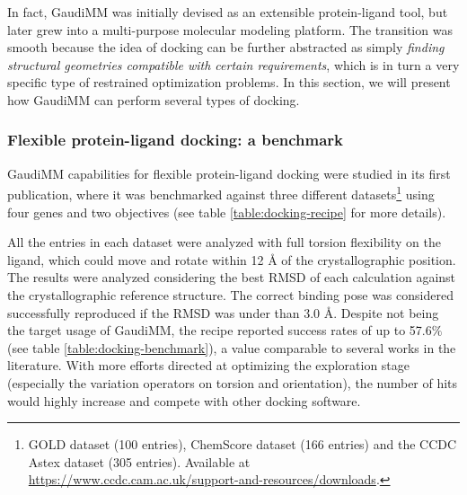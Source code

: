 In fact, GaudiMM was initially devised as an extensible protein-ligand tool, but later grew into a multi-purpose molecular modeling platform. The transition was smooth because the idea of docking can be further abstracted as simply \textit{finding structural geometries compatible with certain requirements}, which is in turn a very specific type of restrained optimization problems. In this section, we will present how GaudiMM can perform several types of docking.


\subsubsection{Flexible protein-ligand docking: a benchmark}


GaudiMM capabilities for flexible protein-ligand docking were studied in its first publication,\cite{gaudimm} where it was benchmarked against three different datasets\footnote{GOLD dataset (100 entries), ChemScore dataset (166 entries) and the CCDC Astex dataset (305 entries). Available at \url{https://www.ccdc.cam.ac.uk/support-and-resources/downloads}.} using four genes and two objectives (see table \ref{table:docking-recipe} for more details).

All the entries in each dataset were analyzed with full torsion flexibility on the ligand, which could move and rotate within 12 Å of the crystallographic position. The results were analyzed considering the best RMSD of each calculation against the crystallographic reference structure. The correct binding pose was considered successfully reproduced if the RMSD was under than 3.0 Å. Despite not being the target usage of GaudiMM, the recipe reported success rates of up to 57.6$\%$ (see table \ref{table:docking-benchmark}), a value comparable to several works in the literature.\cite{pagadala2017software} With more efforts directed at optimizing the exploration stage (especially the variation operators on torsion and orientation), the number of hits would highly increase and compete with other docking software.


